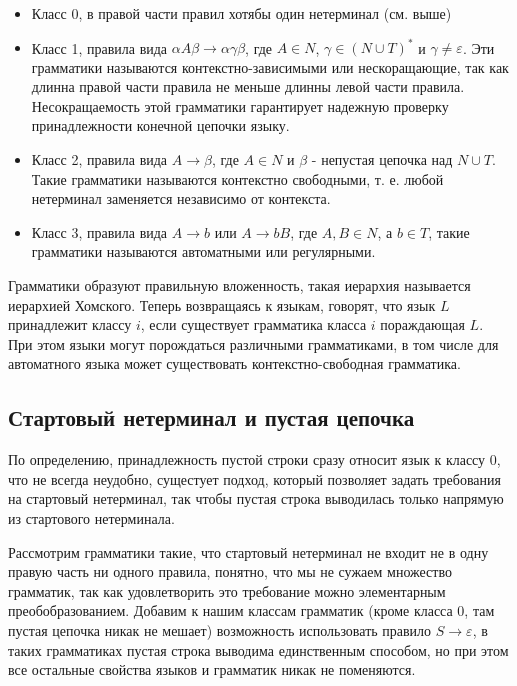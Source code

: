 \begin{itemize}
\item Класс 0, в правой части правил хотябы один нетерминал (см. выше)

\item Класс 1, правила вида $\alpha A \beta \rightarrow \alpha \gamma \beta$, где $A \in N$, $\gamma \in \left(N \cup T\right)^{*}$ и $\gamma \not= \varepsilon$.
Эти грамматики называются контекстно-зависимыми или нескоращающие, так как длинна правой части правила не меньше длинны левой части правила. Несокращаемость
этой грамматики гарантирует надежную проверку принадлежности конечной цепочки языку.

\item Класс 2, правила вида $A \rightarrow \beta$, где $A \in N$ и $\beta$ - непустая цепочка над $N\cup T$. Такие грамматики называются контекстно свободными, т. е.
любой нетерминал заменяется независимо от контекста.

\item Класс 3, правила вида $A \rightarrow b$ или $A \rightarrow bB$, где $A,B \in N$, а $b \in T$, такие грамматики называются автоматными или регулярными.
\end{itemize}

Грамматики образуют правильную вложенность, такая иерархия называется иерархией Хомского. Теперь возвращаясь к языкам, говорят, что язык $L$ принадлежит классу $i$,
если существует грамматика класса $i$ пораждающая $L$. При этом языки могут порождаться различными грамматиками, в том числе для автоматного языка может существовать
контекстно-свободная грамматика.

\subsection{Стартовый нетерминал и пустая цепочка}

По определению, принадлежность пустой строки сразу относит язык к классу 0, что не всегда неудобно, сущестует подход, который позволяет задать требования на стартовый
нетерминал, так чтобы пустая строка выводилась только напрямую из стартового нетерминала.

Рассмотрим грамматики такие, что стартовый нетерминал не входит не в одну правую часть ни одного правила, понятно, что мы не сужаем множество грамматик, так как
удовлетворить это требование можно элементарным преобобразованием. Добавим к нашим классам грамматик (кроме класса 0, там пустая цепочка никак не мешает)
возможность использовать правило $S \rightarrow \varepsilon$, в таких грамматиках пустая строка выводима единственным способом, но при этом все остальные свойства
языков и грамматик никак не поменяются.

